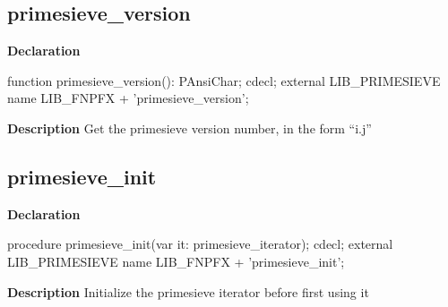 \documentclass{report}
\newif\ifpdf
\begin{document}
\subsection*{primesieve{\_}version}
\fi
\label{primesieve-primesieve_version}
\begin{list}{}{
\setlength{\itemindent}{0cm}
\setlength{\listparindent}{0cm}
\setlength{\leftmargin}{\evensidemargin}
\addtolength{\leftmargin}{\tmplength}
\settowidth{\labelsep}{X}
\addtolength{\leftmargin}{\labelsep}
\setlength{\labelwidth}{\tmplength}
}
\item[\textbf{Declaration}\hfill]
\ifpdf
\begin{flushleft}
\fi
\begin{ttfamily}
function primesieve{\_}version(): PAnsiChar; cdecl; external LIB{\_}PRIMESIEVE name LIB{\_}FNPFX + 'primesieve{\_}version';\end{ttfamily}

\ifpdf
\end{flushleft}
\fi

\par
\item[\textbf{Description}]
Get the primesieve version number, in the form “i.j”

\end{list}
\ifpdf
\subsection*{\large{\textbf{primesieve{\_}init}}\normalsize\hspace{1ex}\hrulefill}
\else
\subsection*{primesieve{\_}init}
\fi
\label{primesieve-primesieve_init}
\begin{list}{}{
\setlength{\itemindent}{0cm}
\setlength{\listparindent}{0cm}
\setlength{\leftmargin}{\evensidemargin}
\addtolength{\leftmargin}{\tmplength}
\settowidth{\labelsep}{X}
\addtolength{\leftmargin}{\labelsep}
\setlength{\labelwidth}{\tmplength}
}
\item[\textbf{Declaration}\hfill]
\ifpdf
\begin{flushleft}
\fi
\begin{ttfamily}
procedure primesieve{\_}init(var it: primesieve{\_}iterator); cdecl; external LIB{\_}PRIMESIEVE name LIB{\_}FNPFX + 'primesieve{\_}init';\end{ttfamily}

\ifpdf
\end{flushleft}
\fi

\par
\item[\textbf{Description}]
Initialize the primesieve iterator before first using it

\end{list}
\ifpdf
\end{document}
